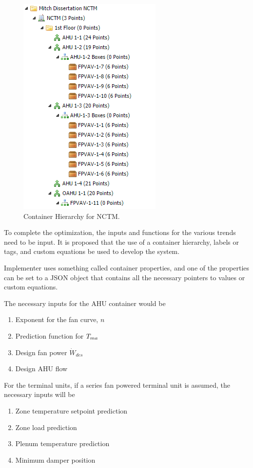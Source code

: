 \begin{figure}
\centering
\includegraphics{Images/ContainerHierarchy.PNG}
\caption{Container Hierarchy for NCTM.}
\label{fig:ContainerHierarchy}
\end{figure}

To complete the optimization, the inputs and functions for the
various trends need to be input. It is proposed that the use of a
container hierarchy, labels or tags, and custom equations be used to
develop the system.

Implementer uses something called container properties, and one of the
properties can be set to a JSON object that contains all the necessary
pointers to values or custom equations.

The necessary inputs for the AHU container would be 
\begin{enumerate}
    \item Exponent for the fan curve, \(n\)
    \item Prediction function for \(T_{ma}{}\) 
    \item Design fan power \(\dot{W}_{des}\)
    \item Design AHU flow 
\end{enumerate}
For the terminal units, if a series fan powered
terminal unit is assumed, the necessary inputs will be
\begin{enumerate}
    \item Zone temperature setpoint prediction
    \item Zone load prediction
    \item Plenum temperature prediction
    \item Minimum damper position
\end{enumerate}

